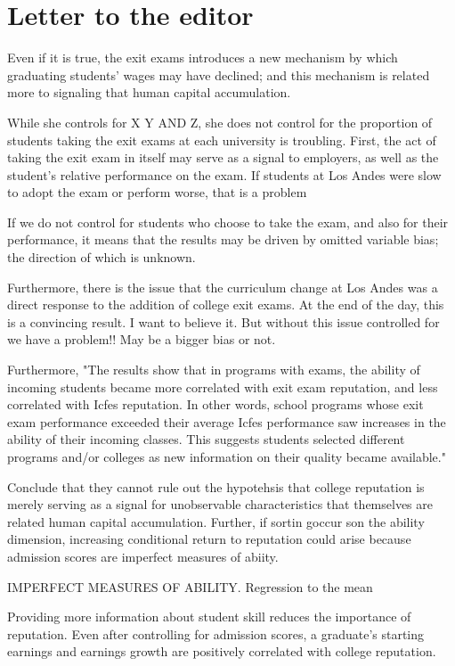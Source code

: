 \documentclass[a4paper, 11pt]{article}
\begin{document}
\section*{Letter to the editor}
Even if it is true, the exit exams introduces a new mechanism by which graduating students' wages may have declined; and this mechanism is related more to signaling that human capital accumulation. 

While she controls for X Y AND Z,  she does not control for the proportion of students taking the exit exams at each university is troubling.   First, the act of taking the exit exam in itself may serve as a signal to employers, as well as the student's relative performance on the exam.  If students at Los Andes were slow to adopt the exam or perform worse, that is a problem

If we do not control for students who choose to take the exam, and also for their performance, it means that the results may be driven by omitted variable bias; the direction of which is unknown.  



Furthermore, there is the issue that the curriculum change at Los Andes was a direct response to the addition of college exit exams.  
At the end of the day, this is a convincing result. I want to believe it.  But without this issue controlled for we have a problem!! May be a bigger bias or not. 

Furthermore, "The results show that in programs with exams, the ability of incoming students
became more correlated with exit exam reputation, and less correlated with Icfes
reputation. In other words, school programs whose exit exam performance exceeded
their average Icfes performance saw increases in the ability of their incoming classes.
This suggests students selected different programs and/or colleges as new information
on their quality became available."


 
 Conclude that they cannot rule out the hypotehsis that college reputation is merely serving as a signal for unobservable characteristics that themselves are related human capital accumulation.  Further, if sortin goccur son the ability dimension, increasing conditional return to reputation could arise because admission scores are imperfect measures of abiity. 
 
IMPERFECT MEASURES OF ABILITY. Regression to the mean
 
Providing more information about student skill reduces the importance of reputation.  Even after controlling for admission scores, a graduate's starting earnings and earnings growth are positively correlated with college reputation. 
\end{document}
